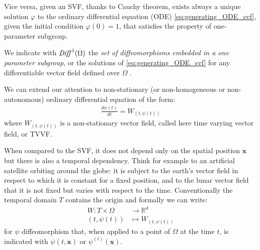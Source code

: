 Vice versa, given an SVF, thanks to Cauchy theorem, exists always a unique solution $\varphi$ to the ordinary differential equation (ODE) \ref{eq:generating_ODE_svf}, given the initial condition $\varphi(0) = 1$, that satisfies the property of one-parameter subgroup.

We indicate with $\text{\emph{Diff}}^{1}(\Omega)$ the \emph{set of diffeomorphisms embedded in a one parameter subgroup}, or the solutions of \ref{eq:generating_ODE_svf} for any differentiable vector field defined over $\Omega$ . 

We can extend our attention to non-stationary (or non-homogeneous or non-autonomous) ordinary differential equation of the form:
\begin{align}\label{eq:generating_ODE_tvvf}
\frac{d\psi(t)}{dt} = W_{(t, \psi(t))}
\end{align}
where $W_{(t, \psi(t))}$ is a non-stationary vector field, called here time varying vector field, or TVVF. 

When compared to the SVF, it does not depend only on the spatial position $\mathbf{x}$ but there is also a temporal dependency. 
Think for example to an artificial satellite orbiting around the globe: it is subject to the earth's vector field in respect to which it is constant for a fixed position, and to the lunar vector field that it is not fixed but varies with respect to the time. Conventionally the temporal domain $T$ contains the origin and formally we can write:
\begin{align*}
W : T\times \Omega & \longrightarrow  \mathbb{R}^d \\
(t, \psi(t)) &\longmapsto  W_{(t, \psi(t))}
\end{align*}
for $\psi$ diffeomorphism that, when applied to a point of $\Omega$ at the time $t$, is indicated with $\psi(t,\mathbf{x})$ or $\psi^{(t)}(\mathbf{x})$.

